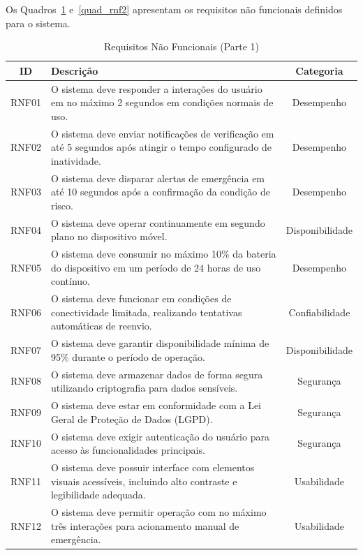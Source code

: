 Os Quadros~\ref{quad_rnf1} e~\ref{quad_rnf2} apresentam os requisitos não funcionais definidos para o sistema.

\begin{table}[H]
\caption{Requisitos Não Funcionais (Parte 1)}
\label{quad_rnf1}
\centering

\begin{tabular}{|c|p{8cm}|c|}
\hline
\textbf{ID} & \textbf{Descrição} & \textbf{Categoria} \\
\hline

RNF01 &
O sistema deve responder a interações do usuário em no máximo 2 segundos em condições normais de uso. &
Desempenho \\
\hline

RNF02 &
O sistema deve enviar notificações de verificação em até 5 segundos após atingir o tempo configurado de inatividade. &
Desempenho \\
\hline

RNF03 &
O sistema deve disparar alertas de emergência em até 10 segundos após a confirmação da condição de risco. &
Desempenho \\
\hline

RNF04 &
O sistema deve operar continuamente em segundo plano no dispositivo móvel. &
Disponibilidade \\
\hline

RNF05 &
O sistema deve consumir no máximo 10\% da bateria do dispositivo em um período de 24 horas de uso contínuo. &
Desempenho \\
\hline

RNF06 &
O sistema deve funcionar em condições de conectividade limitada, realizando tentativas automáticas de reenvio. &
Confiabilidade \\
\hline

RNF07 &
O sistema deve garantir disponibilidade mínima de 95\% durante o período de operação. &
Disponibilidade \\
\hline

RNF08 &
O sistema deve armazenar dados de forma segura utilizando criptografia para dados sensíveis. &
Segurança \\
\hline

RNF09 &
O sistema deve estar em conformidade com a Lei Geral de Proteção de Dados (LGPD). &
Segurança \\
\hline

RNF10 &
O sistema deve exigir autenticação do usuário para acesso às funcionalidades principais. &
Segurança \\
\hline

RNF11 &
O sistema deve possuir interface com elementos visuais acessíveis, incluindo alto contraste e legibilidade adequada. &
Usabilidade \\
\hline

RNF12 &
O sistema deve permitir operação com no máximo três interações para acionamento manual de emergência. &
Usabilidade \\
\hline

\end{tabular}

\end{table}

